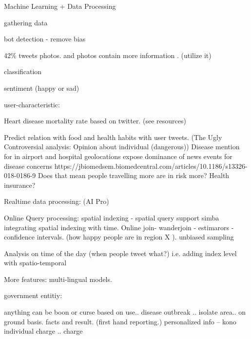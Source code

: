 
Machine Learning  +  Data Processing

gathering data

bot detection - remove bias


42\% tweets photos. and photos contain more information . (utilize it)

classification

sentiment (happy or sad)

user-characteristic:

Heart disease mortality rate based on twitter. (see resources)

Predict relation with food and health habits with user tweets. (The Ugly Controversial analysis: Opinion about individual (dangerous))
  Disease mention for
  in airport and hospital geolocations expose dominance of news events for disease concerns
  https://jbiomedsem.biomedcentral.com/articles/10.1186/s13326-018-0186-9
  Does that mean people travelling more are in risk more? Health insurance?


Realtime data processing:  (AI Pro)

Online Query processing:
  spatial indexing - spatial query support simba
  integrating spatial indexing with time.
  Online join- wanderjoin - estimarors - confidence intervals. (how happy people  are in region X ).
  unbiased sampling

  Analysis on time of the day  (when people tweet what?) i.e. adding index level with spatio-temporal


More features:
multi-lingual models.




government entitiy:

anything can be boon or curse based on use..
disease outbreak .. isolate area.. on ground basis. facts and result. (first hand reporting.)
personalized info -- kono individual charge .. charge 

